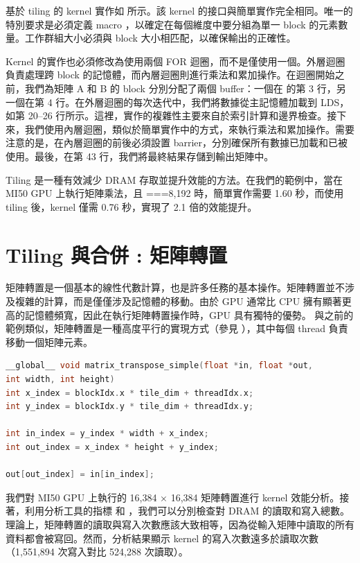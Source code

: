 基於 tiling 的 kernel 實作如  所示。該 kernel 的接口與簡單實作完全相同。唯一的特別要求是必須定義 macro ，以確定在每個維度中要分組為單一 block 的元素數量。工作群組大小必須與 block 大小相匹配，以確保輸出的正確性。

Kernel 的實作也必須修改為使用兩個 FOR 迴圈，而不是僅使用一個。外層迴圈負責處理跨 block 的記憶體，而內層迴圈則進行乘法和累加操作。在迴圈開始之前，我們為矩陣 A 和 B 的 block 分別分配了兩個 buffer：一個在  的第 3 行，另一個在第 4 行。在外層迴圈的每次迭代中，我們將數據從主記憶體加載到 LDS，如第 20–26 行所示。這裡，實作的複雜性主要來自於索引計算和邊界檢查。接下來，我們使用內層迴圈，類似於簡單實作中的方式，來執行乘法和累加操作。需要注意的是，在內層迴圈的前後必須設置 barrier，分別確保所有數據已加載和已被使用。最後，在第 43 行，我們將最終結果存儲到輸出矩陣中。

Tiling 是一種有效減少 DRAM 存取並提升效能的方法。在我們的範例中，當在 MI50 GPU 上執行矩陣乘法，且 ===8,192 時，簡單實作需要 1.60 秒，而使用 tiling 後，kernel 僅需 0.76 秒，實現了 2.1 倍的效能提升。

\section{Tiling 與合併 : 矩陣轉置}
矩陣轉置是一個基本的線性代數計算，也是許多任務的基本操作。矩陣轉置並不涉及複雜的計算，而是僅僅涉及記憶體的移動。由於 GPU 通常比 CPU 擁有顯著更高的記憶體頻寬，因此在執行矩陣轉置操作時，GPU 具有獨特的優勢。
與之前的範例類似，矩陣轉置是一種高度平行的實現方式（參見 ），其中每個 thread 負責移動一個矩陣元素。

\begin{lstlisting}[language=C, caption={簡單矩陣轉置的 kernel 範例。}, captionpos=t, label={lst:transpose}]
__global__ void matrix_transpose_simple(float *in, float *out,
int width, int height)
int x_index = blockIdx.x * tile_dim + threadIdx.x;
int y_index = blockIdx.y * tile_dim + threadIdx.y;

int in_index = y_index * width + x_index;
int out_index = x_index * height + y_index;

out[out_index] = in[in_index];
\end{lstlisting}

我們對 MI50 GPU 上執行的 16,384 × 16,384 矩陣轉置進行 kernel 效能分析。接著，利用分析工具的指標  和 ，我們可以分別檢查對 DRAM 的讀取和寫入總數。理論上，矩陣轉置的讀取與寫入次數應該大致相等，因為從輸入矩陣中讀取的所有資料都會被寫回。然而，分析結果顯示 kernel 的寫入次數遠多於讀取次數（1,551,894 次寫入對比 524,288 次讀取）。

